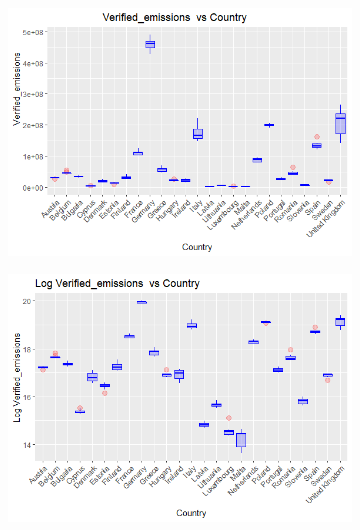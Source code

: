 \documentclass[a4paper,twoside,10pt]{article}
\begin{document}
\begin{figure}[H]
	\centering
	\begin{subfigure}[]{0.8\textwidth}
		\centering
	\includegraphics[width=1\linewidth]{images/Boxplot_Verified}
		\caption{}
		\label{fig:boxplot-Verified emissions-vs_country}
	\end{subfigure}
	\begin{subfigure}[]{0.8\textwidth}
		\centering
	\includegraphics[width=1\linewidth]{images/boxplot_verified_log}
		\caption{}
		\label{fig:boxplot-Verified emissions_vs-country}
	\end{subfigure}
\end{figure}
\end{document}
